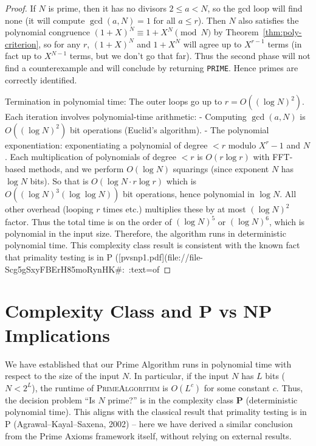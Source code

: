 \documentclass[11pt]{article}
\begin{document}
{\begin{proof}
If $N$ is prime, then it has no divisors $2 \le a < N$, so the gcd loop will find none (it will compute $\gcd(a,N)=1$ for all $a \le r$). Then $N$ also satisfies the polynomial congruence $(1+X)^N \equiv 1+X^N \pmod{N}$ by Theorem~\ref{thm:poly-criterion}, so for any $r$, $(1+X)^N$ and $1+X^N$ will agree up to $X^{r-1}$ terms (in fact up to $X^{N-1}$ terms, but we don’t go that far). Thus the second phase will not find a counterexample and will conclude by returning \texttt{PRIME}. Hence primes are correctly identified.

Termination in polynomial time: The outer loops go up to $r = O((\log N)^2)$. Each iteration involves polynomial-time arithmetic:
- Computing $\gcd(a,N)$ is $O((\log N)^2)$ bit operations (Euclid’s algorithm).
- The polynomial exponentiation: exponentiating a polynomial of degree $<r$ modulo $X^r-1$ and $N$. Each multiplication of polynomials of degree $<r$ is $O(r \log r)$ with FFT-based methods, and we perform $O(\log N)$ squarings (since exponent $N$ has $\log N$ bits). So that is $O(\log N \cdot r \log r)$ which is $O((\log N)^3 (\log\log N))$ bit operations, hence polynomial in $\log N$. All other overhead (looping $r$ times etc.) multiplies these by at most $(\log N)^2$ factor. Thus the total time is on the order of $(\log N)^5$ or $(\log N)^6$, which is polynomial in the input size. Therefore, the algorithm runs in deterministic polynomial time. This complexity class result is consistent with the known fact that primality testing is in P ([pvsnp1.pdf](file://file-Scg5gSxyFBErH85moRynHK#:~:text=of%
\end{proof}

\section{Complexity Class and P vs NP Implications}
We have established that our Prime Algorithm runs in polynomial time with respect to the size of the input $N$. In particular, if the input $N$ has $L$ bits ($N < 2^L$), the runtime of \textsc{PrimeAlgorithm} is $O(L^c)$ for some constant $c$. Thus, the decision problem “Is $N$ prime?” is in the complexity class $\mathbf{P}$ (deterministic polynomial time). This aligns with the classical result that primality testing is in P (Agrawal–Kayal–Saxena, 2002) – here we have derived a similar conclusion from the Prime Axioms framework itself, without relying on external results.

}
\end{document}
